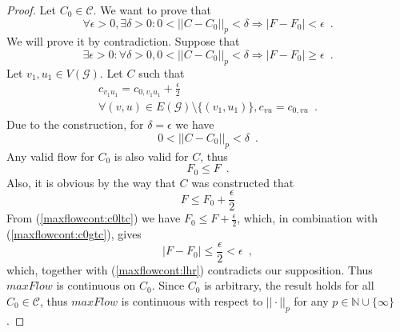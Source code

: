 \begin{proof}
   Let $C_0 \in \mathcal{C}$. We want to prove that
   \begin{equation*}
      \forall \epsilon > 0, \exists \delta > 0 : 0 < ||C - C_0||_p < \delta \Rightarrow |F - F_0| < \epsilon \enspace.
   \end{equation*}
   We will prove it by contradiction. Suppose that
   \begin{equation*}
      \exists \epsilon > 0 : \forall \delta > 0, 0 < ||C - C_0||_p < \delta \Rightarrow |F - F_0| \geq \epsilon \enspace.
   \end{equation*}
   Let $v_1, u_1 \in V\left(\mathcal{G}\right)$. Let $C$ such that
   \begin{equation*}
   \begin{gathered}
      c_{v_1u_1} = c_{0,v_1u_1} + \frac{\epsilon}{2} \\
      \forall \left(v, u\right) \in E\left(\mathcal{G}\right) \setminus \{\left(v_1, u_1\right)\}, c_{vu} = c_{0,vu}
      \enspace.
   \end{gathered}
   \end{equation*}
   Due to the construction, for $\delta = \epsilon$ we have
   \begin{equation}
   \label{maxflowcont:lhr}
      0 < ||C - C_0||_p < \delta \enspace.
   \end{equation}
   Any valid flow for $C_0$ is also valid for $C$, thus
   \begin{equation}
   \label{maxflowcont:c0ltc}
      F_0 \leq F \enspace.
   \end{equation}
   Also, it is obvious by the way that $C$ was constructed that
   \begin{equation}
   \label{maxflowcont:c0gtc}
      F \leq F_0 + \frac{\epsilon}{2}
   \end{equation}
   From (\ref{maxflowcont:c0ltc}) we have $F_0 \leq F + \frac{\epsilon}{2}$, which, in combination with
   (\ref{maxflowcont:c0gtc}), gives 
   \begin{equation*}
      |F - F_0| \leq \frac{\epsilon}{2} < \epsilon \enspace,
   \end{equation*}
   which, together with (\ref{maxflowcont:lhr}) contradicts our supposition. Thus $maxFlow$ is continuous on $C_0$. Since
   $C_0$ is arbitrary, the result holds for all $C_0 \in \mathcal{C}$, thus $maxFlow$ is continuous with respect to
   $||\cdot||_p$ for any $p \in \mathbb{N} \cup \{\infty\}$.
\end{proof}
